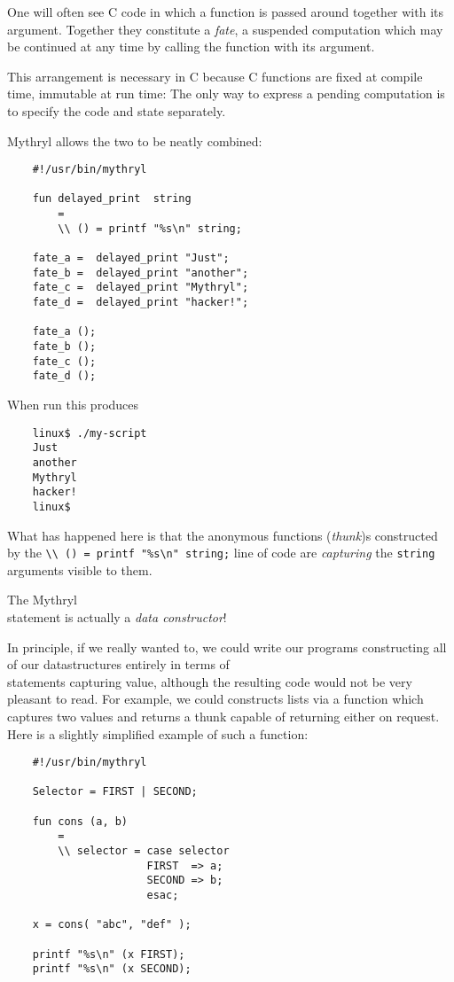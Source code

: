 One will often see C code in which a function is passed around 
together with its argument.  Together they constitute a {\it 
fate}, a suspended computation which may be continued 
at any time by calling the function with its argument.

This arrangement is necessary in C because C functions are fixed 
at compile time, immutable at run time:  The only way to express 
a pending computation is to specify the code and state separately.

Mythryl allows the two to be neatly combined:

\begin{verbatim}
    #!/usr/bin/mythryl

    fun delayed_print  string
        =
        \\ () = printf "%s\n" string;

    fate_a =  delayed_print "Just";
    fate_b =  delayed_print "another";
    fate_c =  delayed_print "Mythryl";
    fate_d =  delayed_print "hacker!";

    fate_a ();
    fate_b ();
    fate_c ();
    fate_d ();
\end{verbatim}

When run this produces

\begin{verbatim}
    linux$ ./my-script
    Just
    another
    Mythryl
    hacker!
    linux$ 
\end{verbatim}

What has happened here is that the anonymous functions ({\it thunk})s constructed 
by the {\tt \verb|\\ () = printf "%s\n" string;|} line of code are {\it capturing} the 
{\tt string} arguments visible to them.

The Mythryl {\tt \\} statement is actually a {\it data constructor}!

In principle, if we really wanted to, we could write our programs 
constructing all of our datastructures entirely in terms of {\tt \\} 
statements capturing value, although the resulting code would not be 
very pleasant to read.  For example, we could constructs lists via 
a function which captures two values and returns a thunk capable of 
returning either on request.  Here is a slightly simplified example 
of such a function:

\begin{verbatim}
    #!/usr/bin/mythryl

    Selector = FIRST | SECOND;

    fun cons (a, b)
        =
        \\ selector = case selector
                      FIRST  => a;
                      SECOND => b;
                      esac;

    x = cons( "abc", "def" );

    printf "%s\n" (x FIRST);
    printf "%s\n" (x SECOND);
\end{verbatim}

